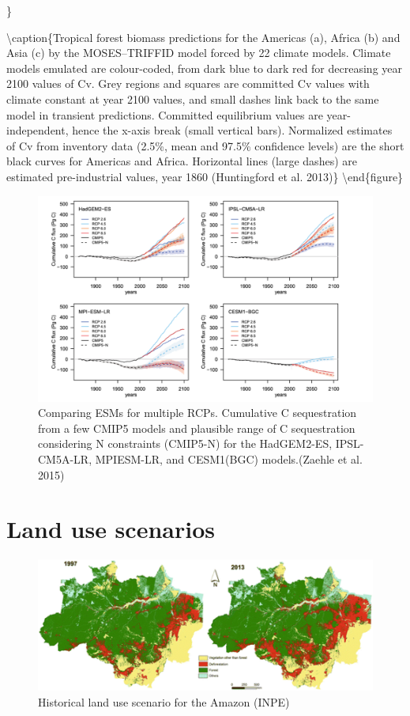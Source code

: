 \documentclass[12pt,oneside]{book}
\begin{document}
\}

\textbackslash{}caption\{Tropical forest biomass predictions for the
Americas (a), Africa (b) and Asia (c) by the MOSES--TRIFFID model forced
by 22 climate models. Climate models emulated are colour-coded, from
dark blue to dark red for decreasing year 2100 values of Cv. Grey
regions and squares are committed Cv values with climate constant at
year 2100 values, and small dashes link back to the same model in
transient predictions. Committed equilibrium values are
year-independent, hence the x-axis break (small vertical bars).
Normalized estimates of Cv from inventory data (2.5\%, mean and 97.5\%
confidence levels) are the short black curves for Americas and Africa.
Horizontal lines (large dashes) are estimated pre-industrial values,
year 1860 (Huntingford et al. 2013)\}\label{fig:f1011}
\textbackslash{}end\{figure\}

\begin{figure}

{\centering \includegraphics[width=0.8\linewidth]{figures/chap10/f10_12_zaehle} 

}

\caption{Comparing ESMs for multiple RCPs. Cumulative C sequestration from a few CMIP5 models and plausible range of C sequestration considering N constraints (CMIP5-N) for the HadGEM2-ES, IPSL-CM5A-LR, MPIESM-LR, and CESM1(BGC) models.(Zaehle et al. 2015)}\label{fig:f1012}
\end{figure}

\section{Land use scenarios}\label{land-use-scenarios}

\begin{figure}

{\centering \includegraphics[width=0.8\linewidth]{figures/chap10/f10_13_LU_inpe} 

}

\caption{Historical land use scenario for the Amazon (INPE)}\label{fig:f1013}
\end{figure}
\end{document}

